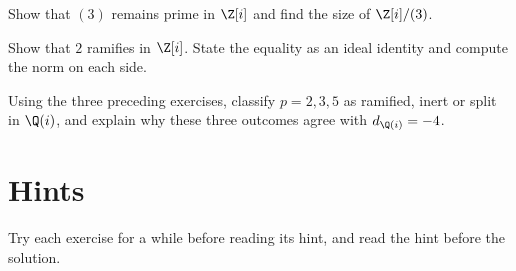 \begin{exercise}[$\star$]\label{ex:v13-extra-04-2}
Show that $(3)$ remains prime in $\Z[i]$ and find the size of $\Z[i]/(3)$.
\end{exercise}

\begin{exercise}[$\star\star$]\label{ex:v13-extra-04-3}
Show that $2$ ramifies in $\Z[i]$. State the equality as an ideal identity and compute the norm on each side.
\end{exercise}

\begin{exercise}[$\star\star\star$]\label{ex:v13-extra-04-4}
Using the three preceding exercises, classify $p=2,3,5$ as ramified, inert or split in $\Q(i)$, and explain why these three outcomes agree with $d_{\Q(i)}=-4$.
\end{exercise}

\section{Hints}

Try each exercise for a while before reading its hint, and read the hint before the solution.

